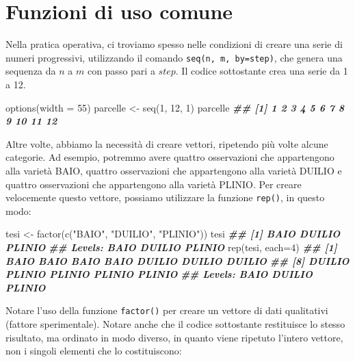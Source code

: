 \documentclass[
  12pt,
]{book}
\newenvironment{Shaded}{\begin{snugshade}}{\end{snugshade}}
\newcommand{\AttributeTok}[1]{\textcolor[rgb]{0.77,0.63,0.00}{#1}}
\newcommand{\DecValTok}[1]{\textcolor[rgb]{0.00,0.00,0.81}{#1}}
\newcommand{\DocumentationTok}[1]{\textcolor[rgb]{0.56,0.35,0.01}{\textbf{\textit{#1}}}}
\newcommand{\FunctionTok}[1]{\textcolor[rgb]{0.00,0.00,0.00}{#1}}
\newcommand{\NormalTok}[1]{#1}
\newcommand{\OtherTok}[1]{\textcolor[rgb]{0.56,0.35,0.01}{#1}}
\newcommand{\StringTok}[1]{\textcolor[rgb]{0.31,0.60,0.02}{#1}}
\begin{document}
\hypertarget{funzioni-di-uso-comune}{%
\section{Funzioni di uso comune}\label{funzioni-di-uso-comune}}

Nella pratica operativa, ci troviamo spesso nelle condizioni di creare una serie di numeri progressivi, utilizzando il comando \texttt{seq(n,\ m,\ by=step)}, che genera una sequenza da \(n\) a \(m\) con passo pari a \(step\). Il codice sottostante crea una serie da 1 a 12.

\begin{Shaded}
\begin{Highlighting}[]
\FunctionTok{options}\NormalTok{(}\AttributeTok{width =} \DecValTok{55}\NormalTok{)}
\NormalTok{parcelle  }\OtherTok{\textless{}{-}}  \FunctionTok{seq}\NormalTok{(}\DecValTok{1}\NormalTok{, }\DecValTok{12}\NormalTok{, }\DecValTok{1}\NormalTok{)}
\NormalTok{parcelle}
\DocumentationTok{\#\#  [1]  1  2  3  4  5  6  7  8  9 10 11 12}
\end{Highlighting}
\end{Shaded}

Altre volte, abbiamo la necessità di creare vettori, ripetendo più volte alcune categorie. Ad esempio, potremmo avere quattro osservazioni che appartengono alla varietà BAIO, quattro osservazioni che appartengono alla varietà DUILIO e quattro osservazioni che appartengono alla varietà PLINIO. Per creare velocemente questo vettore, possiamo utilizzare la funzione \texttt{rep()}, in questo modo:

\begin{Shaded}
\begin{Highlighting}[]
\NormalTok{tesi  }\OtherTok{\textless{}{-}}  \FunctionTok{factor}\NormalTok{(}\FunctionTok{c}\NormalTok{(}\StringTok{"BAIO"}\NormalTok{, }\StringTok{"DUILIO"}\NormalTok{, }\StringTok{"PLINIO"}\NormalTok{))}
\NormalTok{tesi}
\DocumentationTok{\#\# [1] BAIO   DUILIO PLINIO}
\DocumentationTok{\#\# Levels: BAIO DUILIO PLINIO}
\FunctionTok{rep}\NormalTok{(tesi, }\AttributeTok{each=}\DecValTok{4}\NormalTok{)}
\DocumentationTok{\#\#  [1] BAIO   BAIO   BAIO   BAIO   DUILIO DUILIO DUILIO}
\DocumentationTok{\#\#  [8] DUILIO PLINIO PLINIO PLINIO PLINIO}
\DocumentationTok{\#\# Levels: BAIO DUILIO PLINIO}
\end{Highlighting}
\end{Shaded}

Notare l'uso della funzione \texttt{factor()} per creare un vettore di dati qualitativi (fattore sperimentale). Notare anche che il codice sottostante restituisce lo stesso risultato, ma ordinato in modo diverso, in quanto viene ripetuto l'intero vettore, non i singoli elementi che lo costituiscono:
\end{document}

